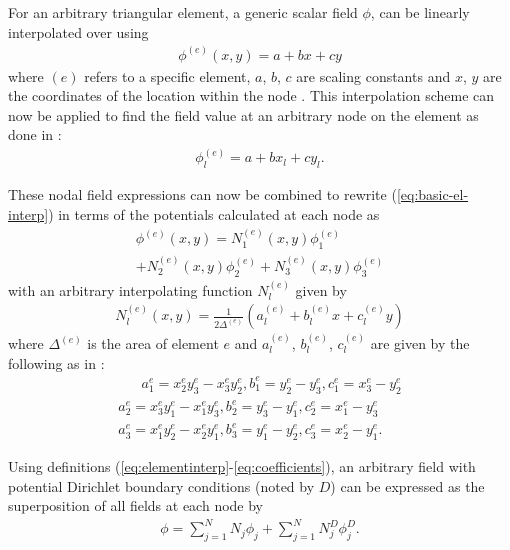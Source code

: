For an arbitrary triangular element, a generic scalar field $\phi$, can be linearly interpolated over using
\begin{align}
	\phi^{(e)}(x,y)=a+bx+cy
	\label{eq:basic-el-interp}
\end{align} 
where $(e)$ refers to a specific element, $a$, $b$, $c$ are scaling constants and $x$, $y$ are the coordinates of the location within the node \cite{jin2011theory}. This interpolation scheme can now be applied to find the field value at an arbitrary node on the element as done in \cite{jin2011theory}:
\begin{align}
	\phi^{(e)}_l=a+bx_l+cy_l.
	\label{eq:node-interp}
\end{align}

These nodal field expressions can now be combined to rewrite (\ref{eq:basic-el-interp}) in terms of the potentials calculated at each node as
\begin{multline}
	\phi^{(e)}(x,y)=N_1^{(e)}(x,y)\phi^{(e)}_1\\+N_2^{(e)}(x,y)\phi^{(e)}_2+N_3^{(e)}(x,y)\phi^{(e)}_3
	\label{eq:elementinterp}
\end{multline} with an arbitrary interpolating function $N_l^{(e)}$ given by 
\begin{align}
	N_l^{(e)}(x,y)=\frac{1}{2\Delta^{(e)}}\left(a_l^{(e)}+b_l^{(e)}x+c_l^{(e)}y\right)
\end{align}
where $\Delta^{(e)}$ is the area of element $e$ and $a_l^{(e)}$, $b_l^{(e)}$, $c_l^{(e)}$ are given by the following as in \cite{jin2011theory}:
\begin{multline}
	\quad \ \ \ a_1^{e} = x^{e}_2y^{e}_3-x^{e}_3y^{e}_2,b_1^{e}=y^{e}_2-y^{e}_3, c_1^{e}=x^{e}_3-y^{e}_2
	\\
	a_2^{e} = x^{e}_3y^{e}_1-x^{e}_1y^{e}_3,b_2^{e}=y^{e}_3-y^{e}_1, c_2^{e}=x^{e}_1-y^{e}_3
	\\
	a_3^{e} = x^{e}_1y^{e}_2-x^{e}_2y^{e}_1,b_3^{e}=y^{e}_1-y^{e}_2, c_3^{e}=x^{e}_2-y^{e}_1.
	\label{eq:coefficients}
\end{multline}

Using definitions (\ref{eq:elementinterp}-\ref{eq:coefficients}), an arbitrary field with potential Dirichlet boundary conditions (noted by $D$) can be expressed as the superposition of all fields at each node by 
\begin{align}
	\phi=\sum_{j=1}^{N}N_j\phi_j+\sum_{j=1}^{N}N_j^D\phi_j^D.
	\label{eq:genericfield}
\end{align}

